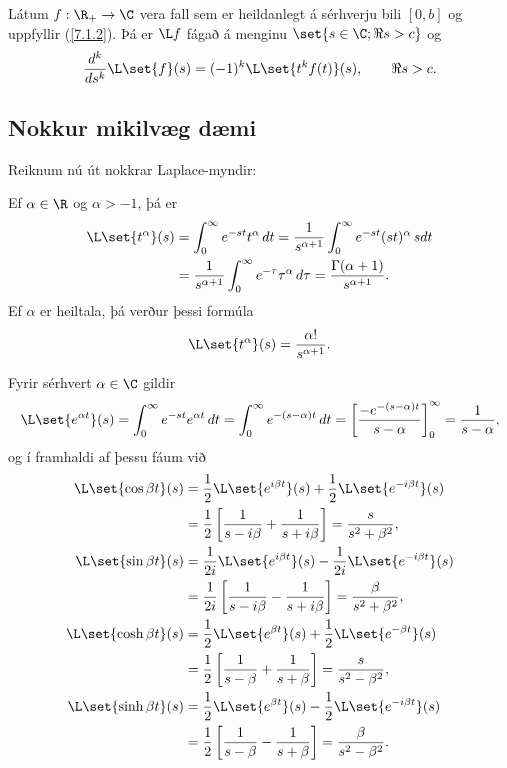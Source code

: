 \begin{se} \label{se10.1.2a} Látum $f:\R_+\to \C$ vera fall sem er heildanlegt á
sérhverju bili $[0,b]$ og   uppfyllir (\ref{7.1.2}).  Þá er $\L f$ 
fágað á menginu $\set{s\in \C;\Re s>c}$ og 
 \begin{equation*}\dfrac{d^k}{ds^k}\L\set{f}(s)=
(-1)^k\L\set{t^kf(t)}(s), \qquad \Re s>c.
\label{7.1.4}
 \end{equation*}
\end{se}

\subsection*{Nokkur mikilvæg dæmi}


Reiknum nú út nokkrar Laplace-myndir:


Ef $\alpha\in \R$ og  $\alpha>-1$, þá er
\begin{align*}
\L\set{t^\alpha}(s)
&=\int_0^\infty e^{-st}t^\alpha \, dt =
\dfrac 1{s^{\alpha+1}} \int_0^\infty e^{-st}(st)^\alpha \, s dt \\
&=
\dfrac 1{s^{\alpha+1}} \int_0^\infty e^{-\tau}\tau^\alpha \,  d\tau =
\dfrac {\Gamma(\alpha+1)}{s^{\alpha+1}}.
\end{align*}
Ef ${\alpha}$ er heiltala, þá verður þessi formúla
$$
\L\set{t^\alpha}(s)
=\dfrac {\alpha!}{s^{\alpha+1}}.
 $$

\smallskip
Fyrir sérhvert $\alpha\in \C$ gildir
 $$
\L\set{e^{\alpha t}}(s)=
\int_0^{\infty}e^{-st}e^{\alpha t}\, dt =
\int_0^{\infty}e^{-(s-\alpha)t}\, dt =
\left[\dfrac {-e^{-(s-\alpha)t}} {s-\alpha}\right]_0^{\infty}=
\dfrac 1{s-\alpha},
 $$
og í framhaldi af þessu fáum við
\begin{align*}
\L\set{\cos\beta t}(s) &=
\frac 12 \L\set{e^{i\beta t}}(s) +\frac 12\L\set{e^{-i\beta t}}(s)\\
&=\frac 12\left[\dfrac 1{s-i\beta}+\dfrac 1{s+i\beta}\right]
=\dfrac s{s^2+\beta^2},\\
\L\set{\sin\beta t}(s) &=
\frac 1{2i}\L\set{e^{i\beta t}}(s) -\frac 1{2i}\L\set{e^{-i\beta t}}(s)\\
&=\frac 1{2i}\left[\dfrac 1{s-i\beta}-\dfrac 1{s+i\beta}\right]
=\dfrac {\beta}{s^2+\beta^2},\\
\L\set{\cosh \beta t}(s) &= 
\frac 12 \L\set{e^{\beta t}}(s) +\frac 12\L\set{e^{-\beta t}}(s)\\
&=\frac 12\left[\dfrac 1{s-\beta}+\dfrac 1{s+\beta}\right]
=\dfrac s{s^2-\beta^2},\\
\L\set{\sinh \beta t}(s) &= 
\frac 1{2}\L\set{e^{\beta t}}(s) -\frac 1{2}\L\set{e^{-i\beta t}}(s)\\
&=\frac 1{2}\left[\dfrac 1{s-\beta}-\dfrac 1{s+\beta}\right]
=\dfrac \beta{s^2-\beta^2}.
\end{align*}


